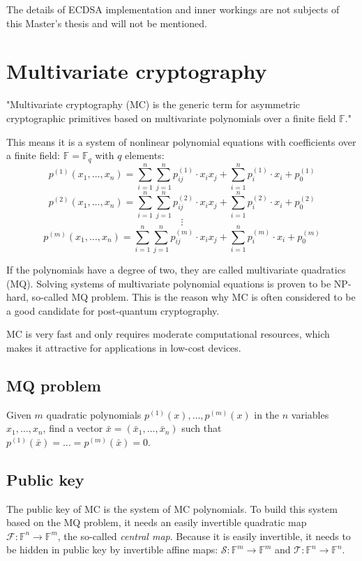\documentclass[thesis=M,english]{FITthesis}[2019/12/23]
\begin{document}
\bigskip
\noindent
The details of ECDSA implementation and inner workings are not subjects of this Master's thesis and will not be mentioned.

\newpage
\section{Multivariate cryptography}
"Multivariate cryptography (MC) is the generic term for asymmetric cryptographic primitives based on multivariate polynomials over a finite field $\mathbb{F}$."\cite{L-WIKI1}

This means it is a system of nonlinear polynomial equations with coefficients over a finite field:
 $\mathbb{F} = \mathbb{F}_q$ with $q$ elements:
\[
p^{(1)}(x_1,\ldots,x_n) = \sum\limits_{i=1}^{n} {\sum\limits_{j=1}^{n} {p_{ij}^{(1)} \cdot x_ix_j}} + \sum\limits_{i=1}^{n} {p_{i}^{(1)} \cdot x_i} + p_0^{(1)}
\]
\[
p^{(2)}(x_1,\ldots,x_n) = \sum\limits_{i=1}^{n} {\sum\limits_{j=1}^{n} {p_{ij}^{(2)} \cdot x_ix_j}} + \sum\limits_{i=1}^{n} {p_{i}^{(2)} \cdot x_i} + p_0^{(2)}
\]
\[
\vdots
\]
\[
p^{(m)}(x_1,\ldots,x_n) = \sum\limits_{i=1}^{n} {\sum\limits_{j=1}^{n} {p_{ij}^{(m)} \cdot x_ix_j}} + \sum\limits_{i=1}^{n} {p_{i}^{(m)} \cdot x_i} + p_0^{(m)}
\]

If the polynomials have a degree of two, they are called multivariate quadratics (MQ). Solving systems of multivariate polynomial equations is proven to be NP-hard, so-called MQ problem. This is the reason why MC is often considered to be a good candidate for post-quantum cryptography.

MC is very fast and only requires moderate computational resources, which makes it attractive for applications in low-cost devices.

\subsection{MQ problem}
Given $m$ quadratic polynomials $p^{(1)}(x),\ldots,p^{(m)}(x)$ in the $n$ variables $x_1,\ldots,x_n$, find a vector $\bar{x} = (\bar{x}_1,\ldots,\bar{x}_n)$ such that $p^{(1)}(\bar{x}) = \ldots = p^{(m)}(\bar{x}) = 0$.

\subsection{Public key}
The public key of MC is the system of MC polynomials. To build this system based on the MQ problem, it needs an easily invertible quadratic map $\mathcal{F}: \mathbb{F}^n \rightarrow \mathbb{F}^m$, the so-called \textit{central map}. Because it is easily invertible, it needs to be hidden in public key by invertible affine maps: $\mathcal{S}: \mathbb{F}^m \rightarrow \mathbb{F}^m$ and $\mathcal{T}: \mathbb{F}^n \rightarrow \mathbb{F}^n$.
\end{document}
